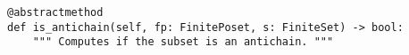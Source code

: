 \par\begin{minipage}{62ex}
\begin{verbatim}
@abstractmethod
def is_antichain(self, fp: FinitePoset, s: FiniteSet) -> bool:
    """ Computes if the subset is an antichain. """
\end{verbatim}
\end{minipage}\par